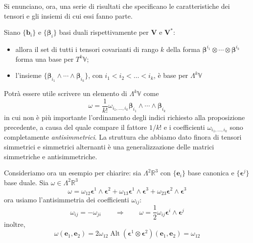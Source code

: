 Si enunciano, ora, una serie di risultati che specificano le caratteristiche dei tensori e gli insiemi di cui essi fanno parte.
\begin{proposition}
    Siano $\{ \mathbf{b}_i\}$ e $\{ \bm{\beta}_i\}$ basi duali rispettivamente per $\mathbf{V}$ e $\mathbf{V}^*$:
    \begin{itemize}
        \item allora il set di tutti i tensori covarianti di rango $k$ della forma $\bm{\beta}^{i_1} \otimes \cdots \otimes \bm{\beta}^{i_k}$ forma una base per $T^k\mathbb{V}$;
        \item l'insieme $\{ \bm{\beta}_{i_1} \wedge \cdots \wedge \bm{\beta}_{i_k} \}$, con $i_1 < i_2 < \dots < i_k$, è base per $\Lambda^k\mathbb{V}$
    \end{itemize}
\end{proposition}
Potrà essere utile scrivere un elemento di $\Lambda^k\mathbb{V}$ come
\[
    \omega = \frac{1}{k!}\omega_{i_1, \dots, i_k} \bm{\beta}_{i_1} \wedge \cdots \wedge \bm{\beta}_{i_k}
\]
in cui non è più importante l'ordinamento degli indici richiesto alla proposizione precedente, a causa del quale compare il fattore $1/k!$ e i coefficienti $\omega_{i_1, \dots, i_k}$ sono completamente \emph{antisimmetrici}. La struttura che abbiamo dato finora di tensori simmetrici e simmetrici alternanti è una generalizzazione delle matrici simmetriche e antisimmetriche.

Consideriamo ora un esempio per chiarire: sia $\Lambda^2\mathbb{R}^3$ con $\{ \mathbf{e}_i \}$ base canonica e $\{ \bm{\epsilon}^j \}$ base duale. Sia $\omega \in \Lambda^2\mathbb{R}^3$
\[
    \omega = \omega_{12} \bm{\epsilon}^1 \wedge \bm{\epsilon}^2 + \omega_{13} \bm{\epsilon}^1 \wedge \bm{\epsilon}^3 + \omega_{23} \bm{\epsilon}^2 \wedge \bm{\epsilon}^3
\]
ora usiamo l'antisimmetria dei coefficienti $\omega_{ij}$:
\[
    \omega_{ij} = -\omega_{ji} \qquad \Longrightarrow \qquad \omega = \frac{1}{2}\omega_{ij} \bm{\epsilon}^i \wedge \bm{\epsilon}^j
\]
inoltre,
\[
    \omega(\mathbf{e}_1, \mathbf{e}_2) = 2 \omega_{12} \operatorname{Alt}(\bm{\epsilon}^1 \otimes \bm{\epsilon}^2) (\mathbf{e}_1, \mathbf{e}_2) = \omega_{12}
\]

